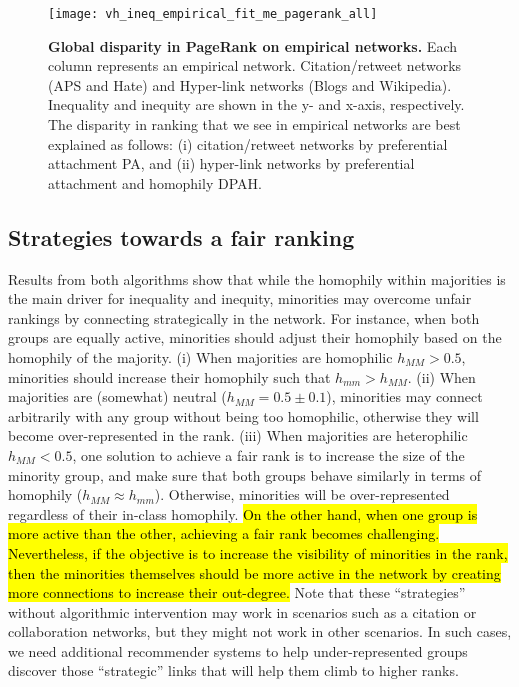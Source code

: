 \documentclass[fleqn,10pt]{wlscirep}
\begin{document}
\begin{figure}[ht]
    \centering
    \texttt{[image: vh\_ineq\_empirical\_fit\_me\_pagerank\_all]}
    \caption{\textbf{Global disparity in PageRank on empirical networks.} Each column represents an empirical network. Citation/retweet networks (APS and Hate) and Hyper-link networks (Blogs and Wikipedia).
    Inequality and inequity are shown in the y- and x-axis, respectively. The disparity in ranking that we see in empirical networks are best explained as follows: (i) citation/retweet networks by preferential attachment PA, and (ii) hyper-link networks by preferential attachment and homophily {DPAH}.}
    \label{fig:empirical}
\end{figure}

\subsection*{Strategies towards a fair ranking}
Results from both algorithms show that while the homophily within majorities is the main driver for inequality and inequity, minorities may overcome unfair rankings by connecting strategically in the network.
For instance, when both groups are equally active, minorities should adjust their homophily based on the homophily of the majority. 
(i) When majorities are homophilic $h_{MM}>0.5$, minorities should increase their homophily such that $h_{mm}>h_{MM}$. 
(ii) When majorities are (somewhat) neutral ($h_{MM}=0.5\pm 0.1$), minorities may connect arbitrarily with any group without being too homophilic, otherwise they will become over-represented in the rank. 
(iii) When majorities are heterophilic $h_{MM}<0.5$, one solution to achieve a fair rank is to increase the size of the minority group, and make sure that both groups behave similarly in terms of homophily ($h_{MM}\approx h_{mm}$). 
Otherwise, minorities will be over-represented regardless of their in-class homophily.
\hl{On the other hand, when one group is more active than the other, achieving a fair rank becomes challenging. Nevertheless, if the objective is to increase the visibility of minorities in the rank, then the minorities themselves should be more active in the network by creating more connections to increase their out-degree.}
Note that these ``strategies'' without algorithmic intervention may work in scenarios such as a citation or collaboration networks, but they might not work in other scenarios. In such cases, we need additional recommender systems to help under-represented groups discover those ``strategic'' links that will help them climb to higher ranks. 
\end{document}
